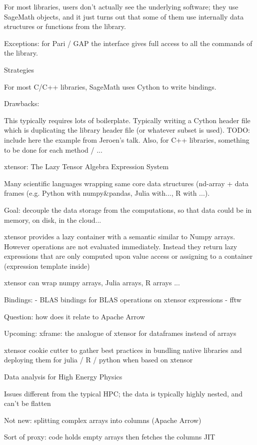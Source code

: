For most libraries, users don't actually see the underlying software; they use SageMath objects, and it just turns out that some of them use internally data structures or functions from the library.

Exceptions: for Pari / GAP the interface gives full access to all the commands of the library.

 Strategies

For most C/C++ libraries, SageMath uses Cython to write bindings.

Drawbacks:

This typically requires lots of boilerplate. Typically writing a Cython header file which is duplicating the library header file (or whatever subset is used). TODO: include here the example from Jeroen's talk. Also, for C++ libraries, something to be done for each method / ...

 xtensor: The Lazy Tensor Algebra Expression System

Many scientific languages wrapping same core data structures (nd-array + data frames
(e.g. Python with numpy\&pandas, Julia with..., R with ...).

Goal: decouple the data storage from the computations, so that data could be in memory, on disk, in the cloud...

xtensor provides a lazy container with a semantic similar to Numpy arrays. However operations
are not evaluated immediately. Instead they return lazy expressions that are
only computed upon value access or assigning to a container (expression template inside)

xtensor can wrap numpy arrays, Julia arrays, R arrays ...

Bindings:
    - BLAS bindings for BLAS operations on xtensor expressions
   - fftw
   
Question: how does it relate to Apache Arrow

Upcoming: xframe: the analogue of xtensor for dataframes instead of arrays

xtensor cookie cutter to gather best practices in bundling native libraries and deploying them for julia / R / python when based on xtensor

 Data analysis for High Energy Physics

Issues different from the typical HPC; the data is typically highly nested, and can't be flatten

 Not new: splitting complex arrays into columns (Apache Arrow)

Sort of proxy: code holds empty arrays then fetches the columns JIT

